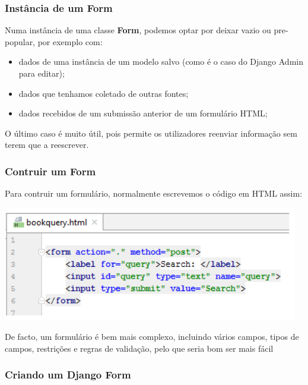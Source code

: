 \documentclass{article}
\begin{document}
\subsubsection{Instância de um Form}

\begin{flushleft}
  Numa instância de uma classe \textbf{Form}, podemos optar por
  deixar vazio ou pre-popular, por exemplo com:
  \begin{itemize}
    \item dados de uma instância de um modelo salvo (como é o caso do Django Admin para editar);
    \item dados que tenhamos coletado de outras fontes;
    \item dados recebidos de um submissão anterior de um formulário HTML;
  \end{itemize}

  O último caso é muito útil, pois permite os utilizadores reenviar informação
  sem terem que a reescrever.
\end{flushleft}

\subsubsection{Contruir um Form}

\begin{flushleft}
  Para contruir um formulário, normalmente escrevemos o código em HTML assim:

  \begin{center}
    \includegraphics[scale=0.35]{17}
  \end{center}

  De facto, um formulário é bem mais complexo, incluindo vários campos, tipos de campos,
  restrições e regras de validação, pelo que seria bom ser mais fácil
\end{flushleft}

\subsubsection{Criando um Django Form}
\end{document}
